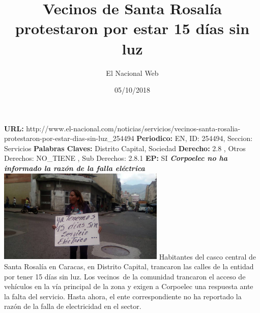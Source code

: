 \documentclass{article}%
\title{\textbf{Vecinos de Santa Rosalía protestaron por estar 15 días sin luz}}%
\author{El Nacional Web}%
\date{05/10/2018}%
\begin{document}
%
\normalsize%
\maketitle%
\textbf{URL: }%
http://www.el{-}nacional.com/noticias/servicios/vecinos{-}santa{-}rosalia{-}protestaron{-}por{-}estar{-}dias{-}sin{-}luz\_254494\newline%
%
\textbf{Periodico: }%
EN, %
ID: %
254494, %
Seccion: %
Servicios\newline%
%
\textbf{Palabras Claves: }%
Distrito Capital, Sociedad\newline%
%
\textbf{Derecho: }%
2.8%
, Otros Derechos: %
NO\_TIENE%
, Sub Derechos: %
2.8.1%
\newline%
%
\textbf{EP: }%
SI\newline%
\newline%
%
\textbf{\textit{Corpoelec no ha informado la razón de la falla eléctrica~}}%
\newline%
\newline%
%
\includegraphics[width=300px]{37.jpg}%
\newline%
%
Habitantes del casco central de Santa Rosalía en Caracas, en Distrito Capital, trancaron las calles de la entidad por tener 15 días sin luz.%
\newline%
%
Los vecinos~de la comunidad trancaron el acceso de vehículos en la vía principal de la zona y exigen a Corpoelec una respuesta ante la falta del servicio.%
\newline%
%
Hasta ahora, el ente correspondiente no ha reportado la razón de la falla de electricidad en el sector.%
\newline%
%
\end{document}
